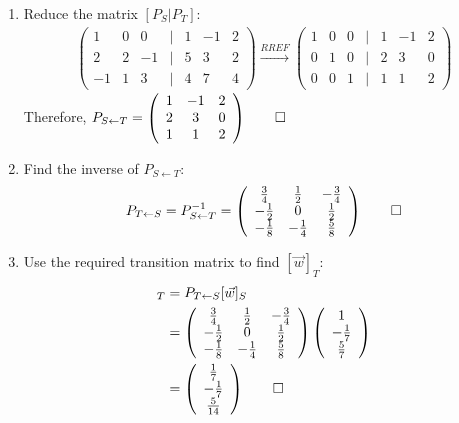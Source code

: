 \documentclass[12pt, a4paper]{article}
\begin{document}
\begin{enumerate}[Q\arabic*.]
\begin{enumerate}[(\alph*)]
      \item Reduce the matrix $[P_S | P_T]$:
        \begin{align*}
          \left(\begin{array}{ccccccc} 1 & 0 & 0 &|& 1 & -1 & 2\\ 2 & 2 & -1 &|& 5 & 3 & 2\\ -1 & 1 & 3 &|& 4 & 7 & 4 \end{array}\right)
          \xrightarrow{RREF}
          \left(\begin{array}{ccccccc} 1 & 0 & 0 &|& 1 & -1 & 2\\ 0 & 1 & 0 &|& 2 & 3 & 0\\ 0 & 0 & 1 &|& 1 & 1 & 2 \end{array}\right)
        \end{align*}
        Therefore, $P_{S\leftarrow T}=\left(\begin{array}{ccc} 1 & -1 & 2\\ 2 & 3 & 0\\ 1 & 1 & 2 \end{array}\right) \qed$

      \item Find the inverse of $P_{S\leftarrow T}$:
        \begin{align*}
          P_{T\leftarrow S} = P_{S\leftarrow T}^{-1} = \left(\begin{array}{ccc} \frac{3}{4} & \frac{1}{2} & -\frac{3}{4}\\ -\frac{1}{2} & 0 & \frac{1}{2}\\ -\frac{1}{8} & -\frac{1}{4} & \frac{5}{8} \end{array}\right) \qed
        \end{align*}

      \item Use the required transition matrix to find $[\vec{w}]_T$:
        \begin{align*}
          [\vec{w}]_T &= P_{T\leftarrow S}[\vec{w}]_S\\
                      &= \left(\begin{array}{ccc} \frac{3}{4} & \frac{1}{2} & -\frac{3}{4}\\ -\frac{1}{2} & 0 & \frac{1}{2}\\ -\frac{1}{8} & -\frac{1}{4} & \frac{5}{8} \end{array}\right)\left(\begin{array}{c} 1\\ -\frac{1}{7}\\ \frac{5}{7} \end{array}\right)\\
                      &= \left(\begin{array}{c} \frac{1}{7}\\ -\frac{1}{7}\\ \frac{5}{14} \end{array}\right) \qed
        \end{align*}
    \end{enumerate}


\end{enumerate}
\end{document}
